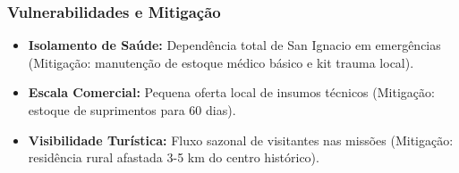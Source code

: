 \subsubsection{Vulnerabilidades e
Mitigação}

\begin{itemize}
\tightlist
\item
  \textbf{Isolamento de Saúde:} Dependência total de San Ignacio em
  emergências (Mitigação: manutenção de estoque médico básico e kit
  trauma local).
\item
  \textbf{Escala Comercial:} Pequena oferta local de insumos técnicos
  (Mitigação: estoque de suprimentos para 60 dias).
\item
  \textbf{Visibilidade Turística:} Fluxo sazonal de visitantes nas
  missões (Mitigação: residência rural afastada 3-5 km do centro
  histórico).
\end{itemize}


